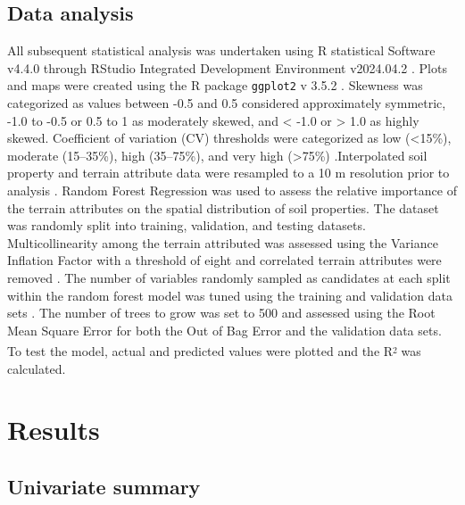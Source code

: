 \documentclass[
  number]{elsarticle}
\begin{document}
\subsection{Data analysis}\label{data-analysis}

All subsequent statistical analysis was undertaken using R statistical
Software v4.4.0 \citep{rcoreteam2024} through RStudio Integrated
Development Environment v2024.04.2 \citep{rstudio2024}. Plots and maps
were created using the R package \texttt{ggplot2} v 3.5.2
\citep{wickham2016}. Skewness was categorized as values between -0.5 and
0.5 considered approximately symmetric, -1.0 to -0.5 or 0.5 to 1 as
moderately skewed, and \textless{} -1.0 or \textgreater{} 1.0 as highly
skewed. Coefficient of variation (CV) thresholds were categorized as low
(\textless15\%), moderate (15--35\%), high (35--75\%), and very high
(\textgreater75\%) .Interpolated soil property and terrain attribute
data were resampled to a 10 m resolution prior to analysis
\citep[\texttt{terra} v1.8.42][]{hijmans2024}. Random Forest Regression
\citep[\texttt{randomForest} v4.7.1.2][]{liaw2002} was used to assess
the relative importance of the terrain attributes on the spatial
distribution of soil properties. The dataset was randomly split into
training, validation, and testing datasets. Multicollinearity among the
terrain attributed was assessed using the Variance Inflation Factor with
a threshold of eight and correlated terrain attributes were removed
\citep[\texttt{usdm} v2.1.7][]{Naimi2014}. The number of variables
randomly sampled as candidates at each split within the random forest
model was tuned using the training and validation data sets
\citep[\texttt{caret} v7.0.1][]{kuhn2008}. The number of trees to grow
was set to 500 and assessed using the Root Mean Square Error for both
the Out of Bag Error and the validation data sets. To test the model,
actual and predicted values were plotted and the
R\textsuperscript{\textsubscript{2}} was calculated.

\section{Results}\label{results}

\subsection{Univariate summary}\label{univariate-summary}
\end{document}
